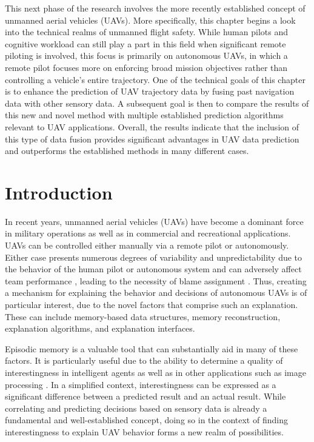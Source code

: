 \documentclass[12pt]{uthesis-v12}  %
\begin{document}
This next phase of the research involves the more recently established concept of unmanned aerial vehicles (UAVs). More specifically, this chapter begins a look into the technical realms of unmanned flight safety. While human pilots and cognitive workload can still play a part in this field when significant remote piloting is involved, this focus is primarily on autonomous UAVs, in which a remote pilot focuses more on enforcing broad mission objectives rather than controlling a vehicle's entire trajectory. One of the technical goals of this chapter is to enhance the prediction of UAV trajectory data by fusing past navigation data with other sensory data. A subsequent goal is then to compare the results of this new and novel method with multiple established prediction algorithms relevant to UAV applications. Overall, the results indicate that the inclusion of this type of data fusion provides significant advantages in UAV data prediction and outperforms the established methods in many different cases.

\section{Introduction}
\label{intro}

In recent years, unmanned aerial vehicles (UAVs) have become a dominant force in military operations as well as in commercial and recreational applications.
UAVs can be controlled either manually via a remote pilot or autonomously.
Either case presents numerous degrees of variability and unpredictability due to the behavior of the human pilot or autonomous system and can adversely affect team performance \cite{salas}, leading to the necessity of blame assignment \cite{malle}.
Thus, creating a mechanism for explaining the behavior and decisions of autonomous UAVs is of particular interest, due to the novel factors that comprise such an explanation. 
These can include memory-based data structures, memory reconstruction, explanation algorithms, and explanation interfaces.

Episodic memory is a valuable tool that can substantially aid in many of these factors.
It is particularly useful due to the ability to determine a quality of interestingness in intelligent agents \cite{kadlec,macedo,macedo2,macedo3,nuxoll} as well as in other applications such as image processing \cite{chu,derbinsky}. 
In a simplified context, interestingness can be expressed as a significant difference between a predicted result and an actual result.
While correlating and predicting decisions based on sensory data \cite{javaid} is already a fundamental and well-established concept, doing so in the context of finding interestingness to explain UAV behavior forms a new realm of possibilities.
\end{document}
